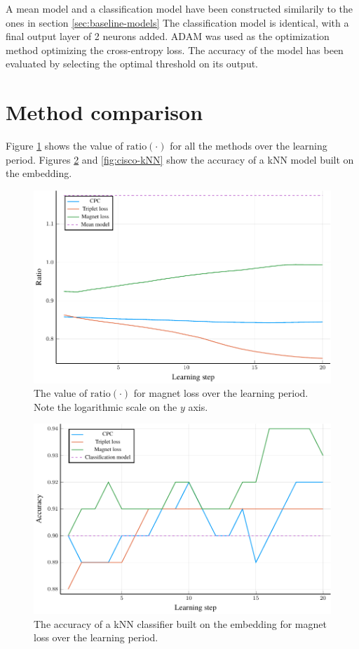 A mean model and a classification model have been constructed similarily to the ones in section \ref{sec:baseline-models}
The classification model is identical, with a final output layer of 2 neurons added. ADAM was used as the optimization method optimizing the cross-entropy loss. The accuracy of the model has been evaluated by selecting the optimal threshold on its output.

\section{Method comparison}

Figure \ref{fig:cisco-ratio} shows the value of \( \mathrm{ratio} \left( \cdot \right) \) for all the methods over the learning period. Figures \ref{fig:cisco-accuracy} and \ref{fig:cisco-kNN} show the accuracy of a kNN model built on the embedding.

\begin{figure}[h]
  \centering
  \includegraphics[width=\textwidth]{images/cisco/ratio/cisco-ratio.pdf}
  \caption{The value of \( \mathrm{ratio} \left( \cdot \right) \) for magnet loss over the learning period. Note the logarithmic scale on the \( y \) axis.}\label{fig:cisco-ratio}
\end{figure}

\begin{figure}[h]
  \centering
  \includegraphics[width=\textwidth]{images/cisco/accuracy/cisco-accuracy.pdf}
  \caption{The accuracy of a kNN classifier built on the embedding for magnet loss over the learning period.}\label{fig:cisco-accuracy}
\end{figure}

